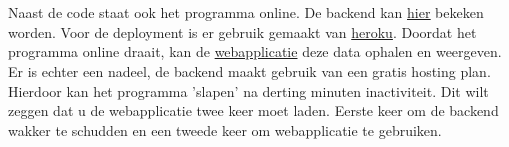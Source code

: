 \section{}
Naast de code staat ook het programma online. De backend kan \href{https://indy-bap-backend.herokuapp.com/api/locations}{\underline{hier}} bekeken worden. Voor de deployment is er gebruik gemaakt van \href{www.heroku.com}{heroku}. Doordat het programma online draait, kan de \href{https://indy-bap-frontend.netlify.com/}{webapplicatie} deze data ophalen en weergeven.
\newline
Er is echter een nadeel, de backend maakt gebruik van een gratis hosting plan. Hierdoor kan het programma 'slapen' na derting minuten inactiviteit. Dit wilt zeggen dat u de webapplicatie twee keer moet laden. Eerste keer om de backend wakker te schudden en een tweede keer om webapplicatie te gebruiken.